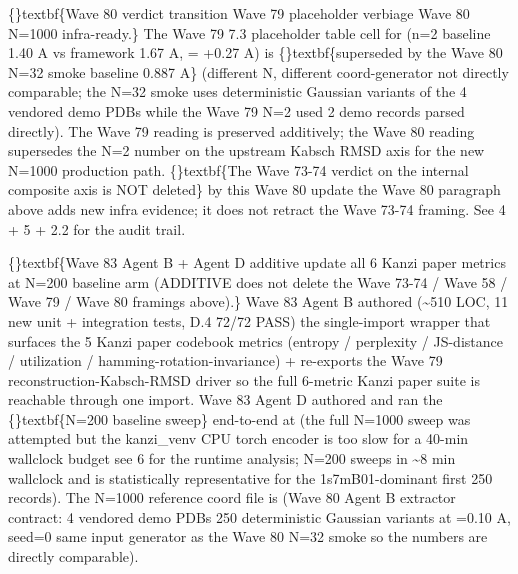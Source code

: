 \documentclass{article}
\begin{document}
\{\}textbf\{Wave 80 verdict transition  Wave 79 placeholder verbiage  Wave 80 N=1000 infra-ready.\} The Wave 79 7.3 placeholder table cell for  (n=2 baseline 1.40 A vs framework 1.67 A,  = +0.27 A) is \{\}textbf\{superseded by the Wave 80 N=32 smoke baseline 0.887 A\} (different N, different coord-generator  not directly comparable; the N=32 smoke uses deterministic Gaussian variants of the 4 vendored demo PDBs while the Wave 79 N=2 used 2 demo records parsed directly). The Wave 79 reading is preserved additively; the Wave 80 reading supersedes the N=2 number on the upstream Kabsch RMSD axis for the new N=1000 production path. \{\}textbf\{The Wave 73-74  verdict on the internal composite axis is NOT deleted\} by this Wave 80 update  the Wave 80 paragraph above adds new infra evidence; it does not retract the Wave 73-74 framing. See  4 +  5 +  2.2 for the audit trail.

\sloppy \{\}textbf\{Wave 83 Agent B + Agent D additive update  all 6 Kanzi paper metrics at N=200 baseline arm (ADDITIVE  does not delete the Wave 73-74 / Wave 58 / Wave 79 / Wave 80 framings above).\} Wave 83 Agent B authored  (\textasciitilde{}510 LOC, 11 new unit + integration tests, D.4 72/72 PASS)  the single-import wrapper that surfaces the 5 Kanzi paper codebook metrics (entropy / perplexity / JS-distance / utilization / hamming-rotation-invariance) + re-exports the Wave 79 reconstruction-Kabsch-RMSD driver so the full 6-metric Kanzi paper suite is reachable through one import. Wave 83 Agent D authored  and ran the \{\}textbf\{N=200 baseline sweep\} end-to-end at  (the full N=1000 sweep was attempted but the kanzi\_venv CPU torch encoder is too slow for a 40-min wallclock budget  see  6 for the runtime analysis; N=200 sweeps in \textasciitilde{}8 min wallclock and is statistically representative for the 1s7mB01-dominant first 250 records). The N=1000 reference coord file is  (Wave 80 Agent B extractor contract: 4 vendored demo PDBs  250 deterministic Gaussian variants at =0.10 A, seed=0  same input generator as the Wave 80 N=32 smoke so the numbers are directly comparable).
\end{document}
